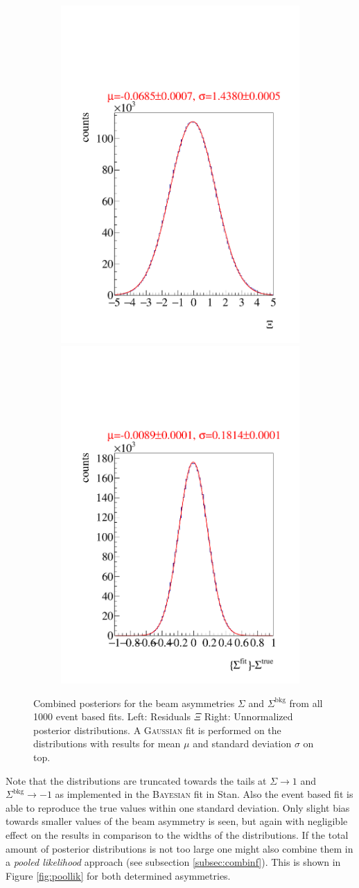 \begin{figure}[htbp]
\begin{subfigure}{\linewidth}
		\includegraphics[width=.49\linewidth]{../bayes/event_based_fit/plots/combined_post_add.pdf}
		\includegraphics[width=.49\linewidth]{../bayes/event_based_fit/plots/combined_post_add_raw.pdf}
	\end{subfigure}
	\caption{Combined posteriors for the beam asymmetries $\Sigma$ and $\Sigma^\text{bkg}$ from all 1000 event based fits. Left: Residuals $\Xi$ Right: Unnormalized posterior distributions. A \textsc{Gaussian} fit is performed on the distributions with results for mean $\mu$ and standard deviation $\sigma$ on top.}
	\label{fig:toyMCposteriors}
\end{figure}
Note that the distributions are truncated towards the tails at $\Sigma\to1$ and $\Sigma^\text{bkg}\to-1$ as implemented in the \textsc{Bayesian} fit in Stan. Also the event based fit is able to reproduce the true values within one standard deviation. Only slight bias towards smaller values of the beam asymmetry is seen, but again with negligible effect on the results in comparison to the widths of the distributions. If the total amount of posterior distributions is not too large one might also combine them in a \emph{pooled likelihood} approach (see subsection \ref{subsec:combinf}). This is shown in Figure \ref{fig:poollik} for both determined asymmetries.
